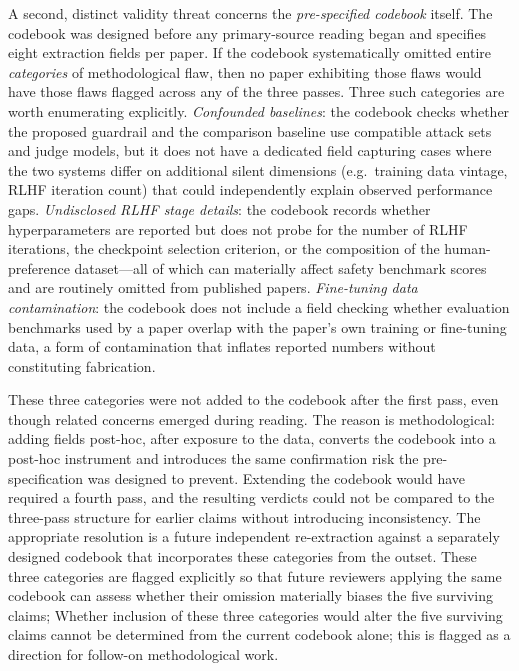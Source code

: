 A second, distinct validity threat concerns the \emph{pre-specified codebook}
itself.
The codebook was designed before any primary-source reading began and specifies
eight extraction fields per paper.
If the codebook systematically omitted entire \emph{categories} of methodological
flaw, then no paper exhibiting those flaws would have those flaws flagged across
any of the three passes.
Three such categories are worth enumerating explicitly.
\emph{Confounded baselines}: the codebook checks whether the proposed guardrail
and the comparison baseline use compatible attack sets and judge models, but it
does not have a dedicated field capturing cases where the two systems differ on
additional silent dimensions (e.g.\ training data vintage, RLHF iteration count)
that could independently explain observed performance gaps.
\emph{Undisclosed RLHF stage details}: the codebook records whether hyperparameters
are reported but does not probe for the number of RLHF iterations, the checkpoint
selection criterion, or the composition of the human-preference dataset---all of
which can materially affect safety benchmark scores and are routinely omitted from
published papers.
\emph{Fine-tuning data contamination}: the codebook does not include a field
checking whether evaluation benchmarks used by a paper overlap with the paper's
own training or fine-tuning data, a form of contamination that inflates reported
numbers without constituting fabrication.

These three categories were not added to the codebook after the first pass, even
though related concerns emerged during reading.
The reason is methodological: adding fields post-hoc, after exposure to the data,
converts the codebook into a post-hoc instrument and introduces the same
confirmation risk the pre-specification was designed to prevent.
Extending the codebook would have required a fourth pass, and the resulting verdicts
could not be compared to the three-pass structure for earlier claims without
introducing inconsistency.
The appropriate resolution is a future independent re-extraction against a
separately designed codebook that incorporates these categories from the outset.
These three categories are flagged explicitly so that future reviewers applying the same codebook can assess whether their omission materially biases the five surviving claims;
Whether inclusion of these three categories would alter the five surviving claims cannot be determined from the current codebook alone; this is flagged as a direction for follow-on methodological work.

